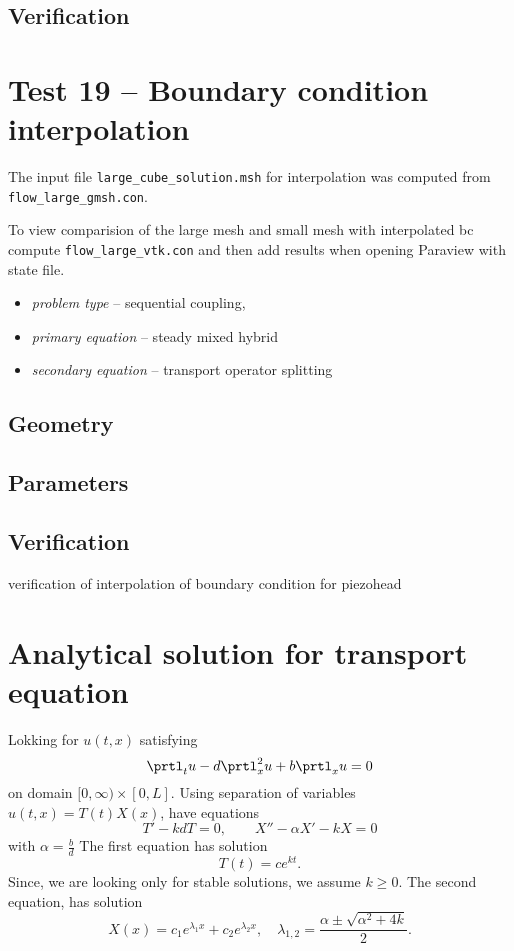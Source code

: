 \subsection*{Verification}



\section{Test 19 -- Boundary condition interpolation}

The input file \verb'large_cube_solution.msh' for interpolation was computed from \verb'flow_large_gmsh.con'.

To view comparision of the large mesh and small mesh with interpolated bc
compute \verb'flow_large_vtk.con' and then add results when opening Paraview with state file.

\begin{itemize} 
    \item \emph{problem type} -- sequential coupling, 
    \item \emph{primary equation} -- steady mixed hybrid
    \item \emph{secondary equation} -- transport operator splitting
  \end{itemize}

\subsection*{Geometry}


\subsection*{Parameters}

\subsection*{Verification}
verification of interpolation of boundary condition for piezohead


\section{Analytical solution for transport equation}
Lokking for $u(t,x)$ satisfying
\[
   \prtl_t u - d \prtl^2_x u + b \prtl_x u =0
\]
on domain $[0,\infty)\times [0,L]$. Using separation of variables $u(t,x) = T(t)X(x)$, have equations
\[
    T' - kd T =0,\qquad X''-\alpha X' - k X=0
\]
with $\alpha=\frac{b}{d}$ The first equation has solution
\[
   T(t) = c e^{kt}.
\]
Since, we are looking only for stable solutions, we assume $k\ge0$. The second equation, has solution
\[
   X(x)=c_1e^{\lambda_1 x}+c_2e^{\lambda_2 x},\quad \lambda_{1,2} = \frac{\alpha \pm \sqrt{\alpha^2 + 4k}}{2}.
\]

